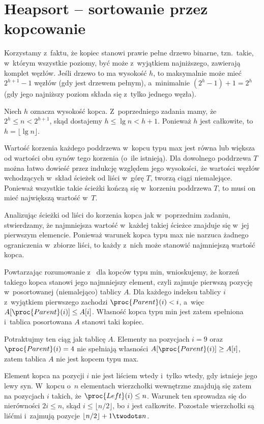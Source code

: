 \chapter{Heapsort -- sortowanie przez kopcowanie}


\exercise %
Korzystamy z~faktu, że kopiec stanowi prawie pełne drzewo binarne, tzn.\ takie, w~którym wszystkie poziomy, być może z~wyjątkiem najniższego, zawierają komplet węzłów. Jeśli drzewo to ma wysokość $h$, to maksymalnie może mieć $2^{h+1}-1$ węzłów (gdy jest drzewem pełnym), a~minimalnie $(2^h-1)+1=2^h$ (gdy jego najniższy poziom składa się z~tylko jednego węzła).

\exercise %
Niech $h$ oznacza wysokość kopca. Z~poprzedniego zadania mamy, że $2^h\le n<2^{h+1}$, skąd dostajemy $h\le\lg n<h+1$. Ponieważ $h$ jest całkowite, to $h=\lfloor\lg n\rfloor$.

\exercise %
Wartość korzenia każdego poddrzewa w~kopcu typu max jest równa lub większa od wartości obu synów tego korzenia (o~ile istnieją). Dla dowolnego poddrzewa $T$ można łatwo dowieść przez indukcję względem jego wysokości, że wartości węzłów wchodzących w~skład ścieżek od liści w~górę $T$, tworzą ciągi niemalejące. Ponieważ wszystkie takie ścieżki kończą się w~korzeniu poddrzewa $T$, to musi on mieć największą wartość w~$T$.

\exercise %
Analizując ścieżki od liści do korzenia kopca jak w~poprzednim zadaniu, stwierdzamy, że najmniejsza wartość w~każdej takiej ścieżce znajduje się w~jej pierwszym elemencie. Ponieważ warunek kopca typu max nie narzuca żadnego ograniczenia w~zbiorze liści, to każdy z~nich może stanowić najmniejszą wartość kopca.

\exercise %
Powtarzając rozumowanie z~ dla kopców typu min, wnioskujemy, że korzeń takiego kopca stanowi jego najmniejszy element, czyli zajmuje pierwszą pozycję w~posortowanej (niemalejąco) tablicy $A$. Dla każdego indeksu tablicy $i$ z~wyjątkiem pierwszego zachodzi $\proc{Parent}(i)<i$, a~więc $A[\proc{Parent}(i)]\le A[i]$. Własność kopca typu min jest zatem spełniona i~tablica posortowana $A$ stanowi taki kopiec.

\exercise %
Potraktujmy ten ciąg jak tablicę $A$. Elementy na pozycjach $i=9$ oraz $\proc{Parent}(i)=4$ nie spełniają własności $A[\proc{Parent}(i)]\ge A[i]$, zatem tablica $A$ nie jest kopcem typu max.

\exercise %
Element kopca na pozycji $i$ nie jest liściem wtedy i~tylko wtedy, gdy istnieje jego lewy syn. W~kopcu o~$n$ elementach wierzchołki wewnętrzne znajdują się zatem na pozycjach $i$ takich, że $\proc{Left}(i)\le n$. Warunek ten sprowadza się do nierówności $2i\le n$, skąd $i\le\lfloor n/2\rfloor$, bo $i$ jest całkowite. Pozostałe wierzchołki są liśćmi i~zajmują pozycje $\lfloor n/2\rfloor+1\twodots n$.

